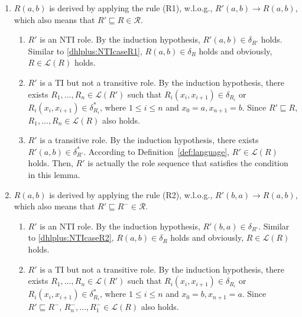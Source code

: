 \begin{enumerate}[leftmargin=12ex,label=Case~3.\arabic*, ref=Case~3.\arabic*]
\item $R(a,b)$ is derived by applying the rule (R1), w.l.o.g., $R'(a,b)\rightarrow R(a,b)$,
    which also means that $R'\sqsubseteq R\in\mathcal{R}$.\label{dhlplus:TIcaseR1}

    \begin{enumerate}[leftmargin=8ex,label=Case~3.1.\arabic*]
    \item $R'$ is an NTI role. By the induction hypothesis, $R'(a,b)\in\delta_{R'}$ holds.
        Similar to \ref{dhlplus:NTIcaseR1}, $R(a,b)\in\delta_{R}$ holds and
        obviously, $R\in\mathcal{L}(R)$ holds.

    \item $R'$ is a TI but not a transitive role.
        By the induction hypothesis, there exists $R_1,...,R_n\in\mathcal{L}(R')$
        such that $R_i(x_i,x_{i+1})\in\delta_{R_i}$ or $R_i(x_i,x_{i+1})\in\delta^*_{R_i}$, where $1\leq i\leq n$
        and $x_0=a, x_{n+1}=b$. Since $R'\sqsubseteq R$, $R_1,...,R_n\in\mathcal{L}(R)$ also holds.

    \item $R'$ is a transitive role.
        By the induction hypothesis, there exists $R'(a,b)\in\delta^*_{R'}$.
        According to Definition~\ref{def:language}, $R'\in\mathcal{L}(R)$ holds.
        Then, $R'$ is actually the role sequence that satisfies the condition
        in this lemma.
    \end{enumerate}

\item $R(a,b)$ is derived by applying the rule (R2), w.l.o.g., $R'(b,a)\rightarrow R(a,b)$,
    which also means that $R'\sqsubseteq R^-\in\mathcal{R}$.

    \begin{enumerate}[leftmargin=8ex,label=Case~3.2.\arabic*]
    \item $R'$ is an NTI role. By the induction hypothesis, $R'(b,a)\in\delta_{R'}$.
        Similar to \ref{dhlplus:NTIcaseR2}, $R(a,b)\in\delta_{R}$ holds and
        obviously, $R\in\mathcal{L}(R)$ holds.

    \item $R'$ is a TI but not a transitive role. By the induction hypothesis, there exists $R_1,...,R_n\in\mathcal{L}(R')$
        such that $R_i(x_i,x_{i+1})\in\delta_{R_i}$ or $R_i(x_i,x_{i+1})\in\delta^*_{R_i}$, where $1\leq i\leq n$
        and $x_0=b, x_{n+1}=a$. Since $R'\sqsubseteq R^-$, $R_n^-,...,R_1^-\in\mathcal{L}(R)$ also holds.


\end{enumerate}
\end{enumerate}
